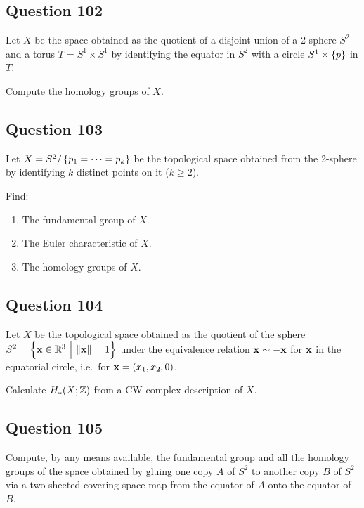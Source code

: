 \documentclass[12pt]{article}
\begin{document}
\hypertarget{question-102-2}{%
\subsection{Question 102}\label{question-102-2}}

Let \(X\) be the space obtained as the quotient of a disjoint union of a
2-sphere \(S^2\) and a torus \(T = S^1 \times S^1\) by identifying the
equator in \(S^2\) with a circle \(S^1 \times \left\{{p}\right\}\) in \(T\).

Compute the homology groups of \(X\).

\hypertarget{question-103-2}{%
\subsection{Question 103}\label{question-103-2}}

Let \(X = S^2 / \left\{{p_1 = \cdots = p_k }\right\}\) be the topological space
obtained from the 2-sphere by identifying \(k\) distinct points on it
(\(k \geq 2\)).

Find:

\begin{enumerate}
\def\labelenumi{\alph{enumi}.}
\item
  The fundamental group of \(X\).
\item
  The Euler characteristic of \(X\).
\item
  The homology groups of \(X\).
\end{enumerate}

\hypertarget{question-104-2}{%
\subsection{Question 104}\label{question-104-2}}

Let \(X\) be the topological space obtained as the quotient of the
sphere
\(S^2 = \left\{{\mathbf{x} \in {\mathbb{R}}^3 {~\mathrel{\Big|}~} {\left\lVert {\mathbf{x}} \right\rVert} = 1}\right\}\)
under the equivalence relation \(\mathbf{x} \sim -\mathbf{x}\) for
\(\mathbf{x}\) in the equatorial circle, i.e.~for
\(\mathbf{x} = (x_1, x_2, 0)\).

Calculate \(H_* (X; {\mathbb{Z}})\) from a CW complex description of \(X\).

\hypertarget{question-105-2}{%
\subsection{Question 105}\label{question-105-2}}

Compute, by any means available, the fundamental group and all the
homology groups of the space obtained by gluing one copy \(A\) of
\(S^2\) to another copy \(B\) of \(S^2\) via a two-sheeted covering
space map from the equator of \(A\) onto the equator of \(B\).
\end{document}
